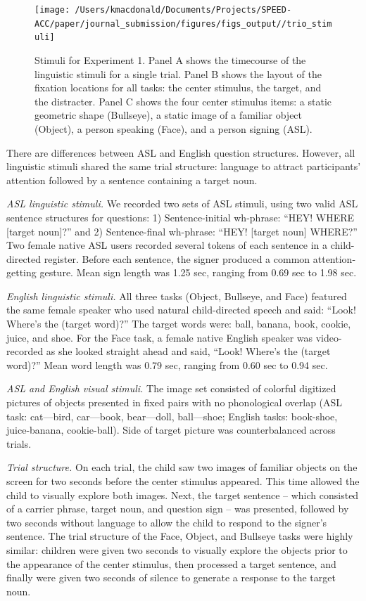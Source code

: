 \documentclass[english,floatsintext,man]{apa6}
\begin{document}
\begin{figure}[!ht]

{\centering \texttt{[image: /Users/kmacdonald/Documents/Projects/SPEED-ACC/paper/journal\_submission/figures/figs\_output//trio\_stimuli]} 

}

\caption{Stimuli for Experiment 1. Panel A shows the timecourse of the linguistic stimuli for a single trial. Panel B shows the layout of the fixation locations for all tasks: the center stimulus, the target, and the distracter. Panel C shows the four center stimulus items: a static geometric shape (Bullseye), a static image of a familiar object (Object), a person speaking (Face), and a person signing (ASL).}\label{fig:trio-stim}
\end{figure}

There are differences between ASL and English question structures.
However, all linguistic stimuli shared the same trial structure:
language to attract participants' attention followed by a sentence
containing a target noun.

\emph{ASL linguistic stimuli.} We recorded two sets of ASL stimuli,
using two valid ASL sentence structures for questions: 1)
Sentence-initial wh-phrase: \enquote{HEY! WHERE {[}target noun{]}?} and
2) Sentence-final wh-phrase: \enquote{HEY! {[}target noun{]} WHERE?} Two
female native ASL users recorded several tokens of each sentence in a
child-directed register. Before each sentence, the signer produced a
common attention-getting gesture. Mean sign length was 1.25 sec, ranging
from 0.69 sec to 1.98 sec.

\emph{English linguistic stimuli.} All three tasks (Object, Bullseye,
and Face) featured the same female speaker who used natural
child-directed speech and said: \enquote{Look! Where's the (target
word)?} The target words were: ball, banana, book, cookie, juice, and
shoe. For the Face task, a female native English speaker was
video-recorded as she looked straight ahead and said, \enquote{Look!
Where's the (target word)?} Mean word length was 0.79 sec, ranging from
0.60 sec to 0.94 sec.

\emph{ASL and English visual stimuli.} The image set consisted of
colorful digitized pictures of objects presented in fixed pairs with no
phonological overlap (ASL task: cat---bird, car---book, bear---doll,
ball---shoe; English tasks: book-shoe, juice-banana, cookie-ball). Side
of target picture was counterbalanced across trials.

\emph{Trial structure.} On each trial, the child saw two images of
familiar objects on the screen for two seconds before the center
stimulus appeared. This time allowed the child to visually explore both
images. Next, the target sentence -- which consisted of a carrier
phrase, target noun, and question sign -- was presented, followed by two
seconds without language to allow the child to respond to the signer's
sentence. The trial structure of the Face, Object, and Bullseye tasks
were highly similar: children were given two seconds to visually explore
the objects prior to the appearance of the center stimulus, then
processed a target sentence, and finally were given two seconds of
silence to generate a response to the target noun.
\end{document}
